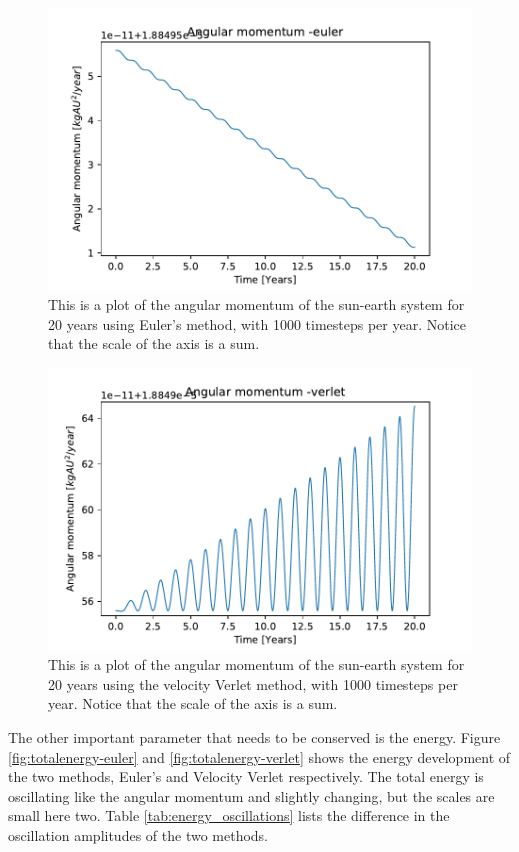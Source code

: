 \begin{figure}[H]
\includegraphics[width=0.9\linewidth]{../results/plots/angularmomentum-euler.pdf}\caption{This is a plot of the angular momentum of the sun-earth system for 20 years using Euler's method, with 1000 timesteps per year. Notice that the scale of the axis is a sum.}\label{fig:angluarmomentum-euler}
\end{figure}	

\begin{figure}[H]
\includegraphics[width=0.9\linewidth]{../results/plots/angularmomentum-verlet.pdf}\caption{This is a plot of the angular momentum of the sun-earth system for 20 years using the velocity Verlet method, with 1000 timesteps per year. Notice that the scale of the axis is a sum.}\label{fig:angularmomentum-verlet}
\end{figure}	

The other important parameter that needs to be conserved is the energy. Figure \ref{fig:totalenergy-euler} and \ref{fig:totalenergy-verlet} shows the energy development of the two methods, Euler's and Velocity Verlet respectively. The total energy is oscillating like the angular momentum and slightly changing, but the scales are small here two. Table \ref{tab:energy_oscillations} lists the difference in the oscillation amplitudes of the two methods. 


